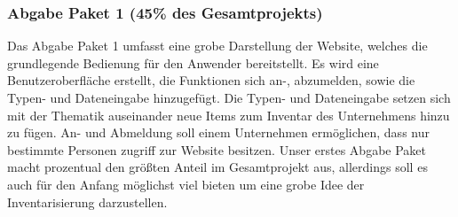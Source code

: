 \documentclass[11pt,a4paper]{report}
\begin{document}
\subsubsection{Abgabe Paket 1 (45\% des Gesamtprojekts)}
Das Abgabe Paket 1 umfasst eine grobe Darstellung der Website, welches die grundlegende Bedienung für den Anwender bereitstellt.
Es wird eine Benutzeroberfläche erstellt, die Funktionen sich an-, abzumelden, sowie die Typen- und Dateneingabe hinzugefügt.
Die Typen- und Dateneingabe setzen sich mit der Thematik auseinander neue Items zum Inventar des Unternehmens hinzu zu fügen.
An- und Abmeldung soll einem Unternehmen ermöglichen, dass nur bestimmte Personen zugriff zur Website besitzen.
Unser erstes Abgabe Paket macht prozentual den größten Anteil im Gesamtprojekt aus, allerdings soll es auch für den Anfang möglichst viel bieten um eine grobe Idee der Inventarisierung darzustellen.
\end{document}
